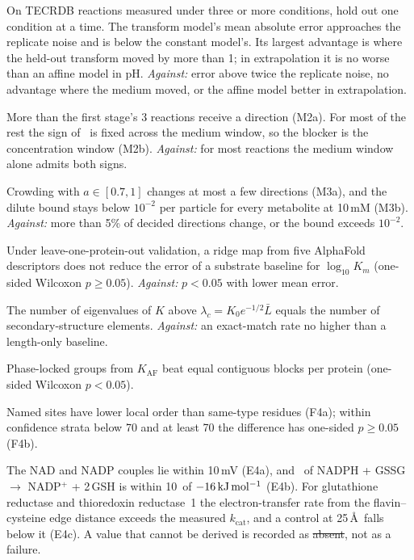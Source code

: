 \begin{description}[style=unboxed,leftmargin=0pt,itemsep=2pt,font=\normalfont\bfseries]
\item[M1] On TECRDB reactions measured under three or more conditions, hold out one condition at a time. The transform model's mean absolute error approaches the replicate noise and is below the constant model's.
Its largest advantage is where the held-out transform moved by more than 1\kJ; in extrapolation it is no worse than an affine model in pH. \emph{Against:} error above twice the replicate noise, no advantage where the medium moved, or the affine model better in extrapolation.
\item[M2] More than the first stage's 3 reactions receive a direction (M2a). For most of the rest the sign of \DGm\ is fixed across the medium window, so the blocker is the concentration window (M2b). \emph{Against:} for most reactions the medium window alone admits both signs.
\item[M3] Crowding with $a\in[0.7,1]$ changes at most a few directions (M3a), and the dilute bound stays below $10^{-2}$ per particle for every metabolite at 10\,mM (M3b). \emph{Against:} more than 5\% of decided directions change, or the bound exceeds $10^{-2}$.
\item[K1] Under leave-one-protein-out validation, a ridge map from five AlphaFold descriptors does not reduce the error of a substrate baseline for $\log_{10}K_m$ (one-sided Wilcoxon $p\ge0.05$). \emph{Against:} $p<0.05$ with lower mean error.
\item[F2] The number of eigenvalues of $K$ above $\lambda_c=K_0e^{-1/2}\bar L$ equals the number of secondary-structure elements. \emph{Against:} an exact-match rate no higher than a length-only baseline.
\item[F3] Phase-locked groups from $K_{\mathrm{AF}}$ beat equal contiguous blocks per protein (one-sided Wilcoxon $p<0.05$).
\item[F4] Named sites have lower local order than same-type residues (F4a); within confidence strata below 70 and at least 70 the difference has one-sided $p\ge0.05$ (F4b).
\item[E4] The NAD and NADP couples lie within 10\,mV (E4a), and \DGp\ of NADPH + GSSG $\to$ NADP$^+$ + 2\,GSH is within 10\kJ\ of $-16\,\mathrm{kJ\,mol^{-1}}$ (E4b).
For glutathione reductase and thioredoxin reductase~1 the electron-transfer rate from the flavin--cysteine edge distance exceeds the measured $k_{\mathrm{cat}}$, and a control at 25\,\AA\ falls below it (E4c). A value that cannot be derived is recorded as \st{absent}, not as a failure.

\end{description}

